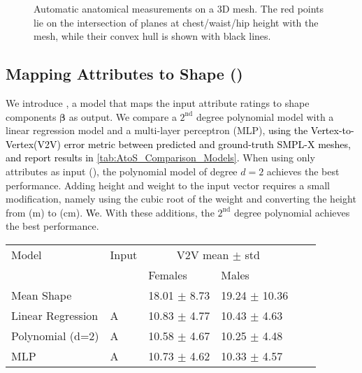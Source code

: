 \documentclass[10pt,twocolumn,letterpaper]{article}
\newcommand{\AtoS}{\text{\mbox{A2S}}\xspace}
\newcommand{\threeD}{3D\xspace}
\newcommand{\smplx}{\mbox{SMPL-X}\xspace}
\newcommand{\shape}{\bm{\beta}}
\newcommand{\vtov}{\mbox{V2V}\xspace}
\newcommand{\vtovlong}{Vertex-to-Vertex\xspace}
\newcommand{\cameraready}[1]{\textcolor{Fuchsia}{{#1}}\xspace}
\renewcommand{\cameraready}[1]{\textcolor{black}{{#1}}\xspace}
\begin{document}
\begin{appendices}
\begin{figure}
    
    \vspace{-00.5 em}
    \caption{
        Automatic anatomical measurements on a \threeD mesh. 
        The red points lie on the intersection of planes at chest/waist/hip height with the mesh, 
        while their convex hull is shown with black lines.
    }
    \label{fig:measurements}
\end{figure}

  \subsection{Mapping Attributes to Shape (\AtoS)}
We introduce \AtoS, a model that maps the input attribute ratings to shape components $\shape$ as output.
We compare
a $2^{\text{nd}}$ degree polynomial model
with a linear regression model and a multi-layer perceptron (MLP),
\cameraready{using the \vtovlong (\vtov)
    error metric between predicted and ground-truth \smplx meshes,
    and report results in \cref{tab:AtoS_Comparison_Models}.
} When using only
attributes as input (\AtoS),
the polynomial model of degree $d=2$ achieves the best performance.
Adding height and weight to the input vector requires a small modification,
namely using the cubic root of the weight and converting the height from (m) to (cm).
\cameraready{We}.
With these additions,
the $2^{\text{nd}}$ degree polynomial achieves the best performance.
\begin{table}
\renewcommand{\arraystretch}{1.2} 
\centering
\scriptsize
\begin{tabular}{llllll}
    \toprule
    Model             & Input                           & \multicolumn{2}{c}{\vtov mean $\pm$ std}  \\
                      &                                 & Females              & Males                       \\
    \midrule
    Mean Shape        &                                & 18.01            $\pm$ 8.73            & 19.24            $\pm$ 10.36           \\ 
    Linear Regression & A                               & 10.83            $\pm$ 4.77            & 10.43            $\pm$ 4.63            \\
    Polynomial (d=2)  & A                               & 10.58   $\pm$ 4.67            & 10.25   $\pm$ 4.48   \\
    MLP             & A                               & 10.73            $\pm$ 4.62   & 10.33            $\pm$ 4.57            \\ 

\end{tabular}
\end{table}
\end{appendices}
\end{document}
